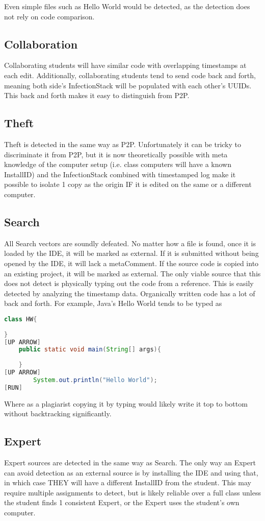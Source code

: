 \documentclass[12pt,final,thesis,actual]{uhthesis}
\newcommand{\installID}{InstallID\xspace}
\newcommand{\metaComment}{metaComment\xspace}
\newcommand{\infectionStack}{InfectionStack\xspace}
\begin{document}
		Even simple files such as Hello World would be detected, as the detection does not rely on code comparison.
	\subsection{\textbf{Collaboration}}
		Collaborating students will have similar code with overlapping timestamps at each edit.  Additionally, collaborating students tend to send code back and forth, meaning both side's \infectionStack will be populated with each other's UUIDs.  This back and forth makes it easy to distinguish from P2P.
	\subsection{\textbf{Theft}}
	Theft is detected in the same way as P2P.  Unfortunately it can be tricky to discriminate it from P2P, but it is now theoretically possible with meta knowledge of the computer setup (i.e. class computers will have a known \installID) and the \infectionStack combined with timestamped log make it possible to isolate 1 copy as the origin IF it is edited on the same or a different computer.  
	\subsection{\textbf{Search}}
		All Search vectors are soundly defeated.  No matter how a file is found, once it is loaded by the IDE, it will be marked as external. If it is submitted without being opened by the IDE, it will lack a \metaComment.  If the source code is copied into an existing project, it will be marked as external.  The only viable source that this does not detect is physically typing out the code from a reference.  This is easily detected by analyzing the timestamp data.  Organically written code has a lot of back and forth.  For example, Java's Hello World tends to be typed as 

\begin{lstlisting}[language=Java]
class HW{
		
}
[UP ARROW]
	public static void main(String[] args){
	
	}
[UP ARROW]
		System.out.println("Hello World");
[RUN]
\end{lstlisting}
		Where as a plagiarist copying it by typing would likely write it top to bottom without backtracking significantly.
	\subsection{\textbf{Expert} }
	Expert sources are detected in the same way as Search.  The only way an Expert can avoid detection as an external source is by installing the IDE and using that, in which case THEY will have a different \installID from the student.  This may require multiple assignments to detect, but is likely reliable over a full class unless the student finds 1 consistent Expert, or the Expert uses the student's own computer.
\end{document}
